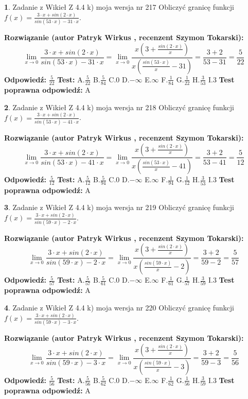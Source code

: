 \documentclass[12pt, a4paper]{article}
\theoremstyle{definition} %
\newtheorem{zad}{}
\newcommand{\zadStart}[1]{\begin{zad}#1\newline}
\newcommand{\zadStop}{\end{zad}}
\newcommand{\rozwStart}[2]{\noindent \textbf{Rozwiązanie (autor #1 , recenzent #2): }\newline}
\newcommand{\rozwStop}{\newline}
\newcommand{\odpStart}{\noindent \textbf{Odpowiedź:}\newline}
\newcommand{\odpStop}{\newline}
\newcommand{\testStart}{\noindent \textbf{Test:}\newline}
\newcommand{\testStop}{\newline}
\newcommand{\kluczStart}{\noindent \textbf{Test poprawna odpowiedź:}\newline}
\newcommand{\kluczStop}{\newline}
\begin{document}
\zadStart{Zadanie z Wikieł Z 4.4 k) moja wersja nr 217}
Obliczyć granicę funkcji $f(x)=\frac{3\cdot x +sin(2\cdot x)}{sin(53\cdot x) -31\cdot x}$.
\zadStop
\rozwStart{Patryk Wirkus}{Szymon Tokarski}
$$\lim\limits_{x\to 0}\frac{3\cdot x +sin(2\cdot x)}{sin(53\cdot x) -31\cdot x}
=\lim\limits_{x\to 0}\frac{x(3+\frac{sin(2\cdot x)}{x})}{x(\frac{sin(53\cdot x)}{x}-31)}
=\frac{3+2}{53-31} = \frac{5}{22}$$
\rozwStop
\odpStart
$\frac{5}{22}$
\odpStop
\testStart
A.$\frac{5}{22}$
B.$\frac{5}{84}$
C.$0$
D.$-\infty$
E.$\infty$
F.$\frac{1}{84}$
G.$\frac{1}{22}$
H.$\frac{3}{53}$
I.$3$
\testStop
\kluczStart
A
\kluczStop



\zadStart{Zadanie z Wikieł Z 4.4 k) moja wersja nr 218}
Obliczyć granicę funkcji $f(x)=\frac{3\cdot x +sin(2\cdot x)}{sin(53\cdot x) -41\cdot x}$.
\zadStop
\rozwStart{Patryk Wirkus}{Szymon Tokarski}
$$\lim\limits_{x\to 0}\frac{3\cdot x +sin(2\cdot x)}{sin(53\cdot x) -41\cdot x}
=\lim\limits_{x\to 0}\frac{x(3+\frac{sin(2\cdot x)}{x})}{x(\frac{sin(53\cdot x)}{x}-41)}
=\frac{3+2}{53-41} = \frac{5}{12}$$
\rozwStop
\odpStart
$\frac{5}{12}$
\odpStop
\testStart
A.$\frac{5}{12}$
B.$\frac{5}{94}$
C.$0$
D.$-\infty$
E.$\infty$
F.$\frac{1}{94}$
G.$\frac{1}{12}$
H.$\frac{3}{53}$
I.$3$
\testStop
\kluczStart
A
\kluczStop



\zadStart{Zadanie z Wikieł Z 4.4 k) moja wersja nr 219}
Obliczyć granicę funkcji $f(x)=\frac{3\cdot x +sin(2\cdot x)}{sin(59\cdot x) -2\cdot x}$.
\zadStop
\rozwStart{Patryk Wirkus}{Szymon Tokarski}
$$\lim\limits_{x\to 0}\frac{3\cdot x +sin(2\cdot x)}{sin(59\cdot x) -2\cdot x}
=\lim\limits_{x\to 0}\frac{x(3+\frac{sin(2\cdot x)}{x})}{x(\frac{sin(59\cdot x)}{x}-2)}
=\frac{3+2}{59-2} = \frac{5}{57}$$
\rozwStop
\odpStart
$\frac{5}{57}$
\odpStop
\testStart
A.$\frac{5}{57}$
B.$\frac{5}{61}$
C.$0$
D.$-\infty$
E.$\infty$
F.$\frac{1}{61}$
G.$\frac{1}{57}$
H.$\frac{3}{59}$
I.$3$
\testStop
\kluczStart
A
\kluczStop



\zadStart{Zadanie z Wikieł Z 4.4 k) moja wersja nr 220}
Obliczyć granicę funkcji $f(x)=\frac{3\cdot x +sin(2\cdot x)}{sin(59\cdot x) -3\cdot x}$.
\zadStop
\rozwStart{Patryk Wirkus}{Szymon Tokarski}
$$\lim\limits_{x\to 0}\frac{3\cdot x +sin(2\cdot x)}{sin(59\cdot x) -3\cdot x}
=\lim\limits_{x\to 0}\frac{x(3+\frac{sin(2\cdot x)}{x})}{x(\frac{sin(59\cdot x)}{x}-3)}
=\frac{3+2}{59-3} = \frac{5}{56}$$
\rozwStop
\odpStart
$\frac{5}{56}$
\odpStop
\testStart
A.$\frac{5}{56}$
B.$\frac{5}{62}$
C.$0$
D.$-\infty$
E.$\infty$
F.$\frac{1}{62}$
G.$\frac{1}{56}$
H.$\frac{3}{59}$
I.$3$
\testStop
\kluczStart
A
\kluczStop
\end{document}
